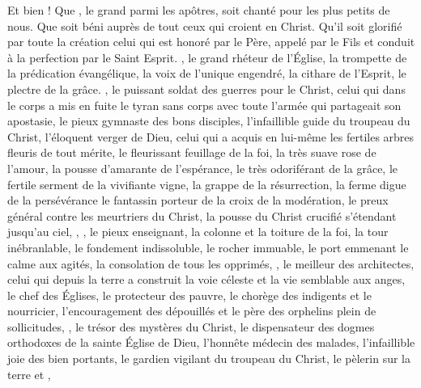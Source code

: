 \saut 
Et bien ! Que , le grand parmi les apôtres, soit chanté pour les plus petits de nous.
Que soit béni  auprès de tout ceux qui croient en Christ.
Qu'il soit glorifié par toute la création celui qui est honoré par le Père, appelé par le Fils et conduit à la perfection par le Saint Esprit. 
, le grand rhéteur de l'Église, la trompette de la prédication évangélique, la voix de l'unique engendré, la cithare de l'Esprit, le plectre de la grâce. 
, le puissant soldat des guerres pour le Christ, 
celui qui dans le corps a mis en fuite le tyran sans corps avec toute l'armée qui partageait son apostasie, 
le pieux gymnaste des bons disciples,
l'infaillible guide du troupeau du Christ,
l'éloquent verger de Dieu,
celui qui a acquis en lui-même les fertiles arbres fleuris de tout mérite,
le fleurissant feuillage de la foi,
la très suave rose de l'amour, %
la pousse d'amarante de l'espérance, 
le très odoriférant  de la grâce,
le fertile serment de la vivifiante vigne,
la  grappe de la résurrection, 
la ferme digue de la persévérance %
le fantassin porteur de la croix de la modération, %
le preux général contre les meurtriers du Christ,
la pousse du Christ crucifié s'étendant jusqu'au ciel,
, ,
le pieux enseignant,
la colonne et la toiture de la foi,
la tour inébranlable, %
le fondement indissoluble, %
le rocher immuable, %
le port emmenant le calme aux agités,  %
la consolation de tous les opprimés,
,
le meilleur des architectes, celui qui  depuis la terre a construit la voie céleste et la vie semblable aux anges,
le chef des Églises, %
le protecteur des pauvre, le chorège  des indigents et le  nourricier,
l'encouragement des dépouillés et le père des orphelins plein de sollicitudes, 
, le trésor des mystères du Christ,
le dispensateur des dogmes orthodoxes de la  sainte Église de Dieu,
l'honnête médecin des malades,
l'infaillible joie des bien portants,
le gardien vigilant  du troupeau du Christ, 
le pèlerin sur la terre et , 
